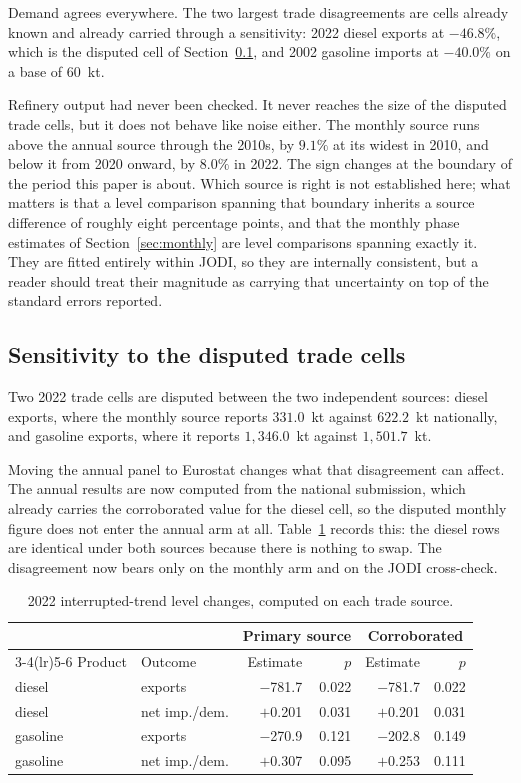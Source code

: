\documentclass[11pt,a4paper]{article}
\begin{document}
Demand agrees everywhere. The two largest trade disagreements are cells already known and
already carried through a sensitivity: 2022 diesel exports at $-46.8\%$, which is the disputed
cell of Section~\ref{sec:sourcesens}, and 2002 gasoline imports at $-40.0\%$ on a base of
$60$~kt.

Refinery output had never been checked. It never reaches the size of the disputed trade cells,
but it does not behave like noise either. The monthly source runs above the annual source
through the 2010s, by $9.1\%$ at its widest in 2010, and below it from 2020 onward, by $8.0\%$
in 2022. The sign changes at the boundary of the period this paper is about. Which source is
right is not established here; what matters is that a level comparison spanning that boundary
inherits a source difference of roughly eight percentage points, and that the monthly phase
estimates of Section~\ref{sec:monthly} are level comparisons spanning exactly it. They are
fitted entirely within JODI, so they are internally consistent, but a reader should treat their
magnitude as carrying that uncertainty on top of the standard errors reported.

\subsection{Sensitivity to the disputed trade cells}
\label{sec:sourcesens}

Two 2022 trade cells are disputed between the two independent sources: diesel exports, where the
monthly source reports $331.0$~kt against $622.2$~kt nationally, and gasoline exports, where it
reports $1{,}346.0$~kt against $1{,}501.7$~kt.

Moving the annual panel to Eurostat changes what that disagreement can affect. The annual
results are now computed from the national submission, which already carries the corroborated
value for the diesel cell, so the disputed monthly figure does not enter the annual arm at all.
Table~\ref{tab:sourcesens} records this: the diesel rows are identical under both sources
because there is nothing to swap. The disagreement now bears only on the monthly arm and on the
JODI cross-check.

\begin{table}[htbp]
\centering
\caption{2022 interrupted-trend level changes, computed on each trade source.}
\label{tab:sourcesens}
\begin{tabular}{llrrrr}
\toprule
& & \multicolumn{2}{c}{Primary source} & \multicolumn{2}{c}{Corroborated} \\
\cmidrule(lr){3-4}\cmidrule(lr){5-6}
Product & Outcome & Estimate & $p$ & Estimate & $p$ \\
\midrule
diesel & exports & $-$781.7 & 0.022 & $-$781.7 & 0.022 \\
diesel & net imp./dem. & $+$0.201 & 0.031 & $+$0.201 & 0.031 \\
gasoline & exports & $-$270.9 & 0.121 & $-$202.8 & 0.149 \\
gasoline & net imp./dem. & $+$0.307 & 0.095 & $+$0.253 & 0.111 \\
\bottomrule
\end{tabular}
\end{table}
\end{document}

